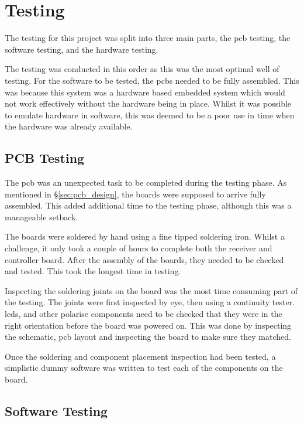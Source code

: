 \documentclass [12pt]{article}
\begin{document}
\section{Testing}

The testing for this project was split into three main parts, the \gls{pcb} testing, the software testing, and the hardware testing. 

The testing was conducted in this order as this was the most optimal well of testing. For the software to be tested, the \gls{pcb}s needed to be fully assembled. This was because this system was a hardware based embedded system which would not work effectively without the hardware being in place. Whilst it was possible to emulate hardware in software, this was deemed to be a poor use in time when the hardware was already available. 

\subsection{PCB Testing}\label{sec:pcb_testing}

The \gls{pcb} was an unexpected task to be completed during the testing phase. As mentioned in §\ref{sec:pcb_design}, the boards were supposed to arrive fully assembled. This added additional time to the testing phase, although this was a manageable setback. 

The boards were soldered by hand using a fine tipped soldering iron. Whilst a challenge, it only took a couple of hours to complete both the receiver and controller board. After the assembly of the boards, they needed to be checked and tested. This took the longest time in testing. 

Inspecting the soldering joints on the board was the most time consuming part of the testing. The joints were first inspected by eye, then using a continuity tester. \gls{led}s, and other polarise components need to be checked that they were in the right orientation before the board was powered on. This was done by inspecting the schematic, \gls{pcb} layout and inspecting the board to make sure they matched.   

Once the soldering and component placement inspection had been tested, a simplistic dummy software was written to test each of the components on the board. 

\subsection{Software Testing}
\end{document}
